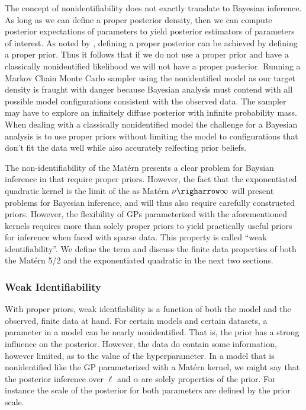 \documentclass{article}
\begin{document}
The concept of nonidentifiability does not exactly translate to Bayesian
inference. As long as we can define a proper posterior density, then we can
compute posterior expectations of parameters to yield posterior estimators of
parameters of interest. As noted by \cite{xie2004note}, defining a proper
posterior can be achieved by defining a proper prior. Thus it follows that if
we do not use a proper prior and have a classically nonidentified likelihood we
will not have a proper posterior. Running a Markov Chain Monte Carlo sampler
using the nonidentified model as our target density is fraught with danger
because Bayesian analysis must contend with all possible model configurations
consistent with the observed data. The sampler may have to explore an
infinitely diffuse posterior with infinite probability mass. When dealing with
a classically nonidentified model the challenge for a Bayesian analysis is to
use proper priors without limiting the model to configurations that don't fit
the data well while also accurately relfecting prior beliefs.

The non-identifiability of the Mat\'{e}rn presents a clear problem for Baysian
inference in that require proper priors. However, the fact that the
exponentiated quadratic kernel is the limit of the as Mat\'{e}rn $\nu
\righarrow \infty$ will present problems for Bayesian inference, and will thus
also require carefully constructed priors. However, the flexibility of GPs
parameterized with the aforementioned kernels requires more than solely proper
priors to yield practically useful priors for inference when faced with sparse
data. This property is called ``weak identifiability''. We define the term and
discuss the finite data properties of both the Mat\'{e}rn 5/2 and the
exponentiated quadratic in the next two sections.

\subsubsection{Weak Identifiability}

With proper priors, weak identfiability is a function of both the model and the
observed, finite data at hand. For certain models and certain datasets, a
parameter in a model can be nearly nonidentified. That is, the prior has a
strong influence on the posterior. However, the data do contain some
information, however limited, as to the value of the hyperparameter. 
In a model that is nonidentified like the GP parameterized with a Mat\'{e}rn
kernel, we might say that the posterior inference over $\ell$ and $\alpha$ are
solely properties of the prior. For instance the scale of the posterior for
both parameters are defined by the prior scale.
\end{document}
